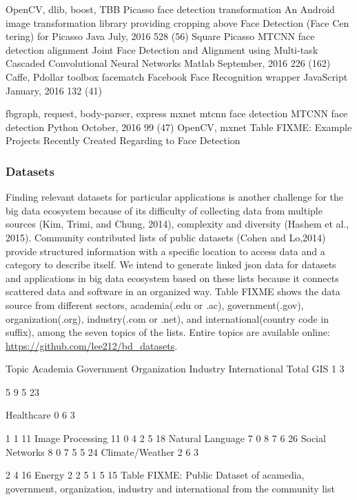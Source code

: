 \documentclass[9pt,twocolumn,twoside]{styles/osajnl}
\begin{document}
	OpenCV,                dlib,
boost, TBB
	Picasso  face
detection transformation
	An  Android  image   transformation library providing cropping above Face Detection (Face Cen tering) for Picasso
	Java
	July, 2016
	528 (56)
	Square Picasso
	MTCNN
face               detection alignment
	Joint Face Detection and Alignment using Multi-task Cascaded Convolutional Neural Networks
	Matlab
	September, 2016
	226 (162)
	Caffe,  Pdollar toolbox
	facematch
	Facebook Face           Recognition
wrapper
	JavaScript
	January, 2016
	132 (41)

	fbgraph,           request,
body-parser,             express
	mxnet mtcnn face detection
	MTCNN face detection
	Python
	October, 2016
	99 (47)
	OpenCV, mxnet
	Table FIXME: Example Projects Recently Created Regarding to Face Detection


\subsubsection{Datasets }

Finding relevant datasets for particular applications is another
challenge for the big data ecosystem because of its difficulty of
collecting data from multiple sources (Kim, Trimi, and Chung, 2014),
complexity and diversity (Hashem et al., 2015). Community contributed
lists of public datasets (Cohen and Lo,2014) provide structured
information with a specific location to access data and a category to
describe itself. We intend to generate linked json data for datasets
and applications in big data ecosystem based on these lists because it
connects scattered data and software in an organized way. Table FIXME
shows the data source from different sectors, academia(.edu or .ac),
government(.gov), organization(.org), industry(.com or .net), and
international(country code in suffix), among the seven topics of the
lists. Entire topics are available online:
\url{https://github.com/lee212/bd_datasets}.


Topic
	Academia
	Government
	Organization
	Industry
	International
	Total
	GIS
	1
	3

	5
	9
	5
	23

	Healthcare
	0
	6
	3

	1
	1
	11
	Image Processing
	11
	0
	4
	2
	5
	18
	Natural Language
	7
	0
	8
	7
	6
	26
	Social Networks
	8
	0
	7
	5
	5
	24
	Climate/Weather
	2
	6
	3

	2
	4
	16
	Energy
	2
	2
	5
	1
	5
	15
	Table FIXME:  Public Dataset of acamedia, government, organization, industry and international from the community list
\end{document}
